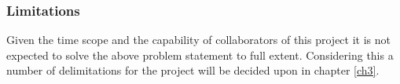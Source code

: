 \subsubsection{Limitations}
Given the time scope and the capability of collaborators of this project it is not expected to solve the above problem statement to full extent. Considering this a number of delimitations for the project will be decided upon in chapter \ref{ch3}.
%
